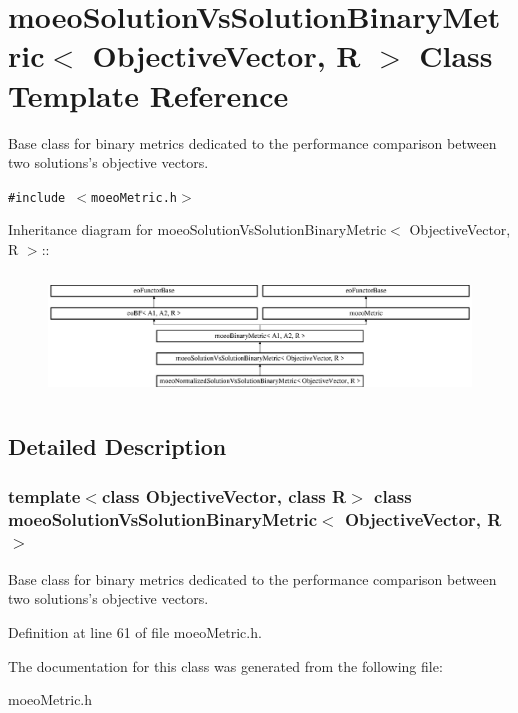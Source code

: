 \section{moeo\-Solution\-Vs\-Solution\-Binary\-Metric$<$ Objective\-Vector, R $>$ Class Template Reference}
\label{classmoeoSolutionVsSolutionBinaryMetric}
Base class for binary metrics dedicated to the performance comparison between two solutions's objective vectors.  


{\tt \#include $<$moeo\-Metric.h$>$}

Inheritance diagram for moeo\-Solution\-Vs\-Solution\-Binary\-Metric$<$ Objective\-Vector, R $>$::\begin{figure}[H]
\begin{center}
\leavevmode
\includegraphics[height=3.30189cm]{classmoeoSolutionVsSolutionBinaryMetric}
\end{center}
\end{figure}


\subsection{Detailed Description}
\subsubsection*{template$<$class Objective\-Vector, class R$>$ class moeo\-Solution\-Vs\-Solution\-Binary\-Metric$<$ Objective\-Vector, R $>$}

Base class for binary metrics dedicated to the performance comparison between two solutions's objective vectors. 



Definition at line 61 of file moeo\-Metric.h.

The documentation for this class was generated from the following file:\begin{CompactItemize}
\item 
moeo\-Metric.h\end{CompactItemize}
